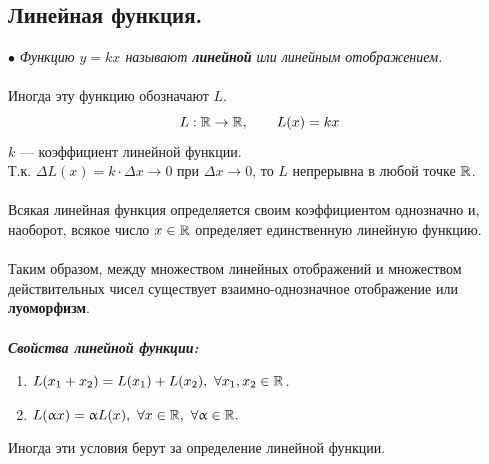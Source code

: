 \subsection{Линейная функция.}
$\bullet$ \textit{Функцию $y=k x$ называют \textbf{линейной} или линейным отображением.}\\\\
Иногда эту функцию обозначают $L$. $$L:\mathbb{R}\to\mathbb{R},\qquad    L(x)=k x$$
$k$ --- коэффициент линейной функции.\\
Т.к. ${\Delta}L(x)=k \cdot {\Delta} x \to 0$ при ${\Delta}x \to 0$, то ${L}$ непрерывна в любой точке $\mathbb{R}$.\\\\
Всякая линейная функция определяется своим коэффициентом однозначно и, наоборот, всякое число $x\in\mathbb{R}$ определяет единственную линейную функцию.\\\\
Таким образом, между множеством линейных отображений и множеством действительных чисел существует взаимно-однозначное отображение или \textbf{луоморфизм}.\\\\
\textbf{\textit{Свойства линейной функции:}}
\begin{enumerate}
	\item \textit{$L(x_1+x_2)=L(x_1)+L(x_2),\ \forall x_1,x_2\in \mathbb{R}$.}
	\item \textit{$L(\upalpha x)=\upalpha L(x),\ \forall x\in\mathbb{R},\ \forall \upalpha\in\mathbb{R}.$}
\end{enumerate}
Иногда эти условия берут за определение линейной функции.
